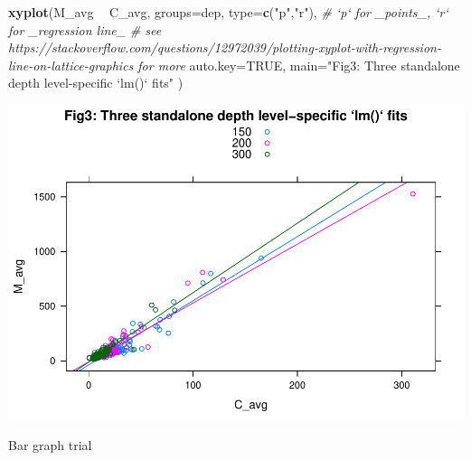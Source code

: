 \documentclass[]{article}
\newenvironment{Shaded}{\begin{snugshade}}{\end{snugshade}}
\newcommand{\CommentTok}[1]{\textcolor[rgb]{0.56,0.35,0.01}{\textit{#1}}}
\newcommand{\DataTypeTok}[1]{\textcolor[rgb]{0.13,0.29,0.53}{#1}}
\newcommand{\KeywordTok}[1]{\textcolor[rgb]{0.13,0.29,0.53}{\textbf{#1}}}
\newcommand{\NormalTok}[1]{#1}
\newcommand{\OperatorTok}[1]{\textcolor[rgb]{0.81,0.36,0.00}{\textbf{#1}}}
\newcommand{\OtherTok}[1]{\textcolor[rgb]{0.56,0.35,0.01}{#1}}
\newcommand{\StringTok}[1]{\textcolor[rgb]{0.31,0.60,0.02}{#1}}
\begin{document}
\begin{Shaded}
\begin{Highlighting}[]
    \KeywordTok{xyplot}\NormalTok{(M_avg }\OperatorTok{~}\StringTok{ }\NormalTok{C_avg, }\DataTypeTok{groups=}\NormalTok{dep, }
                  \DataTypeTok{type=}\KeywordTok{c}\NormalTok{(}\StringTok{"p"}\NormalTok{,}\StringTok{"r"}\NormalTok{), }\CommentTok{# `p` for _points_, `r` for _regression line_}
                                   \CommentTok{# see https://stackoverflow.com/questions/12972039/plotting-xyplot-with-regression-line-on-lattice-graphics for more}
                  \DataTypeTok{auto.key=}\OtherTok{TRUE}\NormalTok{,}
                  \DataTypeTok{main=}\StringTok{"Fig3: Three standalone depth level-specific `lm()` fits"}
\NormalTok{           )}
\end{Highlighting}
\end{Shaded}

\includegraphics{Term_Project_files/figure-latex/unnamed-chunk-2-4.pdf}

Bar graph trial

\begin{Shaded}
\end{Shaded}
\end{document}
